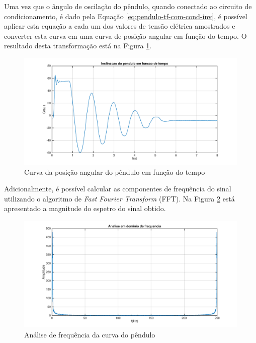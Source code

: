 \documentclass[a4paper]{instrumentacao}
\begin{document}
Uma vez que o ângulo de oscilação do pêndulo, quando conectado ao circuito de condicionamento, é dado pela Equação \ref{eq:pendulo-tf-com-cond-inv}, é possível aplicar esta equação a cada um dos valores de tensão elétrica amostrados e converter esta curva em uma curva de posição angular em função do tempo. O resultado desta transformação está na Figura \ref{fig:pendulo-curva-angulo-vs-tempo}. 

\begin{figure}[H]
\centering
\includegraphics[width=\textwidth]{angle-time-plot.pdf}
\caption{Curva da posição angular do pêndulo em função do tempo}
\label{fig:pendulo-curva-angulo-vs-tempo}
\end{figure}

Adicionalmente, é possível calcular as componentes de frequência do sinal utilizando o algoritmo de \textit{Fast Fourier Transform} (FFT). Na Figura \ref{fig:pendulo-frequencia} está apresentado a magnitude do espetro do sinal obtido.

\begin{figure}[H]
\centering
\includegraphics[width=\textwidth]{frequency-plot.pdf}
\caption{Análise de frequência da curva do pêndulo}
\label{fig:pendulo-frequencia}
\end{figure}
\end{document}
